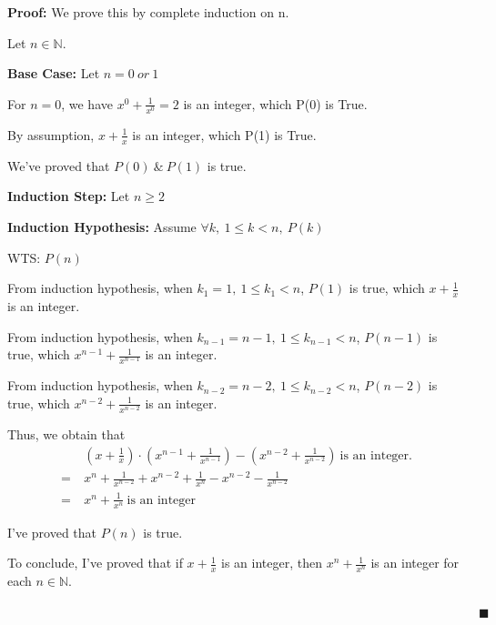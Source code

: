 \documentclass[12pt]{article}
\begin{document}
\begin{enumerate}[label=(\alph*)]
    \textbf{Proof:} We prove this by complete induction on n.

    Let $n \in \mathbb{N}$.

    \textbf{Base Case:} Let $n = 0\ or\ 1$

    For $n=0$, we have $x^0 + \frac{1}{x^0} = 2$ is an integer, which P(0) is True.

    By assumption, $x + \frac{1}{x}$ is an integer, which P(1) is True.

    We've proved that $P(0)\ \&\ P(1)$ is true.

    \textbf{Induction Step:} Let $n \geq 2$
    
    \textbf{Induction Hypothesis:} Assume $\forall k,\ 1 \leq k < n,\ P(k)$

    WTS: $P(n)$

    From induction hypothesis, when $k_1 = 1,\ 1 \leq k_1 < n$, $P(1)$ is true, which $x + \frac{1}{x}$ is an integer.
    
    From induction hypothesis, when $k_{n-1} = n-1,\ 1 \leq k_{n-1} < n$, $P(n-1)$ is true, which $x^{n-1} + \frac{1}{x^{n-1}}$ is an integer.

    From induction hypothesis, when $k_{n-2} = n-2,\ 1 \leq k_{n-2} < n$, $P(n-2)$ is true, which $x^{n-2} + \frac{1}{x^{n-2}}$ is an integer.

    Thus, we obtain that 
    \begin{align*}
        &(x+\frac{1}{x})\cdot (x^{n-1} + \frac{1}{x^{n-1}}) - (x^{n-2} + \frac{1}{x^{n-2}})\ \text{is an integer.} \\
        =\ &x^n + \frac{1}{x^{n-2}} + x^{n-2} + \frac{1}{x^n} - x^{n-2} - \frac{1}{x^{n-2}} \\
        =\ &x^n + \frac{1}{x^n} \ \text{is an integer}
    \end{align*}

    I've proved that $P(n)$ is true.

    To conclude, I've proved that if $x+\frac{1}{x}$ is an integer, then $x^n + \frac{1}{x^n} $ is an integer for each $n \in \mathbb{N}$.

    $\quad \quad \quad \quad \quad \quad \quad \quad \quad \quad \quad \quad \quad \quad \quad \quad \quad \quad \quad \quad \quad \quad \quad \quad \quad \quad \quad \quad \quad \quad \quad \quad \quad \quad \quad \quad \quad \blacksquare $
\end{enumerate}


\end{document}
